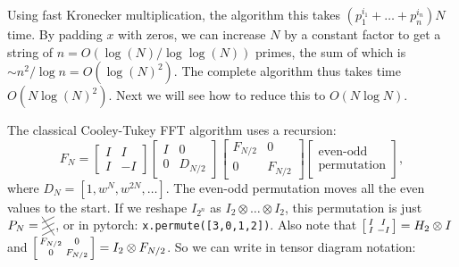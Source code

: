 Using fast Kronecker multiplication, the algorithm this takes $(p_1^{i_1}+\dots+p_n^{i_n}) N$ time.
By padding $x$ with zeros, we can increase $N$ by a constant factor to get a string of $n=O(\log(N)/\log\log(N))$ primes, the sum of which is $\sim n^2/\log n = O(\log(N)^2)$.
The complete algorithm thus takes time $O(N \log(N)^2)$.
Next we will see how to reduce this to $O(N\log N)$.

The classical Cooley-Tukey FFT algorithm uses a recursion:
\[
   \renewcommand*{\arraystretch}{1.3}
F_N =
\begin{bmatrix}
I & I \\
I & -I
\end{bmatrix}
\begin{bmatrix}
I & 0 \\
0 & D_{N/2}
\end{bmatrix}
\begin{bmatrix}
F_{N/2} & 0 \\
0 & F_{N/2}
\end{bmatrix}
\begin{bmatrix}
\text{even-odd} \\
\text{permutation}
\end{bmatrix}
,
\]
where $D_N = [1, w^N, w^{2N}, \dots]$.
The even-odd permutation moves all the even values to the start.
If we reshape $I_{2^n}$ as $I_2\otimes\dots\otimes I_2$, this permutation is just
$
P_N = \begin{tikzpicture}[baseline=.5em, x=1em, y=.5em]
    \draw (0,0) -- (1, 1);
    \draw (0,1) -- (1, 2);
    \draw (0,2) -- (1, 3);
    \draw (0,3) -- (1, 0);
\end{tikzpicture}
$,
or in pytorch: \texttt{x.permute([3,0,1,2])}.
Also note that
$\left[\begin{smallmatrix}I&I\\I&-I\end{smallmatrix}\right] = H_2 \otimes I$ and $\left[\begin{smallmatrix}F_{N/2} & 0\\0&F_{N/2}\end{smallmatrix}\right]=I_2 \otimes F_{N/2}$.
So we can write in tensor diagram notation:
